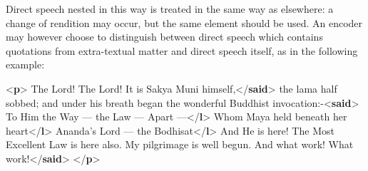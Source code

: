 Direct speech nested in this way is treated in the same way as elsewhere: a change of rendition may occur, but the same element should be used. An encoder may however choose to distinguish between direct speech which contains quotations from extra-textual matter and direct speech itself, as in the following example: \par\bgroup{}\exampleFont \begin{shaded}\noindent\mbox{}{<\textbf{p}>}\mbox{}\newline 
{}The Lord! The Lord! It is Sakya Muni himself,{</\textbf{said}>} the lama half\mbox{}\newline 
 sobbed; and under his breath began the wonderful Buddhist\mbox{}\newline 
 invocation:-{<\textbf{said}>}\mbox{}\newline 
\hspace*{1em}\mbox{}\newline 
\hspace*{1em}\hspace*{1em}To Him the Way — the Law — Apart —{</\textbf{l}>}\mbox{}\newline 
\hspace*{1em}\hspace*{1em}Whom Maya held beneath her heart{</\textbf{l}>}\mbox{}\newline 
\hspace*{1em}\hspace*{1em}Ananda's Lord — the Bodhisat{</\textbf{l}>}\mbox{}\newline 
\hspace*{1em}\mbox{}\newline 
\hspace*{1em}\hspace*{1em} And He is here! The Most Excellent Law is here also. My\mbox{}\newline 
\hspace*{1em}\hspace*{1em} pilgrimage is well begun. And what work! What work!{</\textbf{said}>}\mbox{}\newline 
{</\textbf{p}>}\end{shaded}\egroup\par \par

